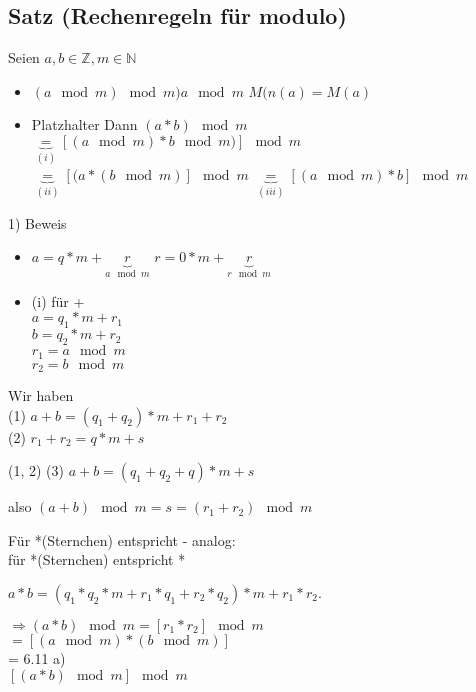 \documentclass[a4paper, 12pt, twoside] {article}
\begin{document}

\subsection{Satz (Rechenregeln für modulo)}
Seien $a, b \in \mathbb{Z}, m \in \mathbb{N}$

\begin{itemize}

\item $(a \mod m) \mod m ) a \mod m$
$M(n(a) = M(a)$

\item Platzhalter
Dann $(a * b) \mod m$ \\
$\underbrace{=}_{(i)}  [(a \mod m) * b \mod m)] \mod m$
$\underbrace{=}_{(ii)}  [(a * (b \mod m)] \mod m$
$\underbrace{=}_{(iii)}  [(a \mod m) * b] \mod m$

\end{itemize}

1) Beweis

\begin{itemize}

\item $a = q * m + \underbrace{r}_{a \mod m}$
$ r = 0 * m + \underbrace{r}_{r \mod m}$

\item (i) für + \\
$a = q_1 * m + r_1$ \\
$b = q_2 * m + r_2$ \\
$r_1 = a \mod m$ \\
$r_2 = b \mod m$
\end{itemize}

Wir haben \\
(1) $a + b = (q_1 + q_2) * m + r_1 + r_2$ \\
(2) $r_1 + r_2 = q * m + s$

(1, 2) (3) $a + b = (q_1 + q_2 + q) * m + s$

also $(a + b) \mod m = s = (r_1 + r_2) \mod m$

Für *(Sternchen) entspricht - analog: \\
für *(Sternchen) entspricht *

$a*b = (q_1 * q_2 * m + r_1 * q_1 + r_2 * q_2) * m + r_1 * r_2.$

$\Rightarrow (a*b) \mod m = [r_1 * r_2] \mod m$ \\
$= [(a \mod m) * (b \mod m)] $\\
 = 6.11 a) \\
$ [(a * b) \mod m] \mod m$
\end{document}
